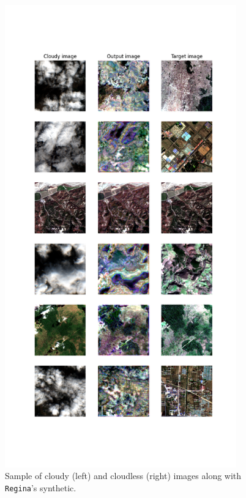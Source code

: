 \begin{figure}[H]
	\centering
	\includegraphics[width=10cm]{imgs/models/models/regina.png}
	\caption{Sample of cloudy (left) and cloudless (right) images along with \texttt{Regina}'s synthetic.}
	\label{fig:models-carla-loss}
\end{figure}
